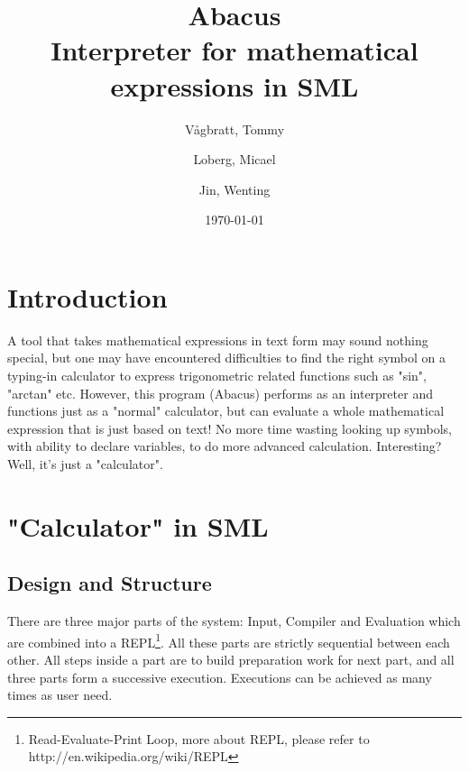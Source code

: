\documentclass[12pt,a4paper]{article}
\title {Abacus \\ Interpreter for mathematical expressions in SML}
\author{
  Vågbratt, Tommy
  \and
  Loberg, Micael
	\and
  Jin, Wenting}
\date{\today}
\begin{document}
\maketitle
\tableofcontents
\newpage


\section{Introduction}
\textnormal{A tool that takes mathematical expressions in text form may sound nothing special, but one may have encountered difficulties to find the right symbol on a typing-in calculator to express trigonometric related functions such as "sin", "arctan" etc. However, this program (Abacus) performs as an interpreter and functions just as a "normal" calculator, but can evaluate a whole mathematical expression that is just based on text! No more time wasting looking up symbols, with ability to declare variables, to do more advanced calculation. Interesting? Well, it's just a "calculator".}

\section{"Calculator" in SML}
\subsection{Design and Structure}
\textnormal{There are three major parts of the system: Input, Compiler and Evaluation which are combined into a REPL\footnote{Read-Evaluate-Print Loop, more about REPL, please refer to http://en.wikipedia.org/wiki/REPL}. All these parts are strictly sequential between each other. All steps inside a part are to build preparation work for next part, and all three parts form a successive execution. Executions can be achieved as many times as user need.}
\end{document}
